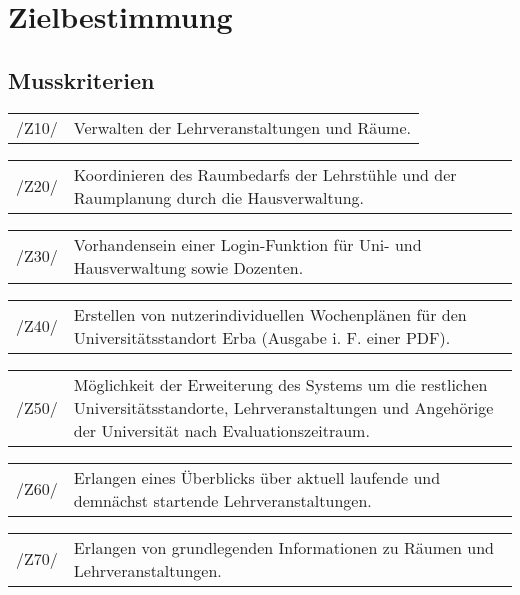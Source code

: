 \section{Zielbestimmung}
\label{sec:Zielbestimmung}

\subsection{Musskriterien}

\begin{tabular}{p{1.5cm}p{14.5cm}}	
	 /Z10/& Verwalten der Lehrveranstaltungen und Räume. \\[0.25cm]
\end{tabular}

\begin{tabular}{p{1.5cm}p{14.5cm}}	
	 /Z20/& Koordinieren des Raumbedarfs der Lehrstühle und der Raumplanung durch die  
  Hausverwaltung. \\[0.25cm]
\end{tabular}

\begin{tabular}{p{1.5cm}p{14.5cm}}	
	 /Z30/& Vorhandensein einer Login-Funktion für Uni- und Hausverwaltung sowie Dozenten. \\[0.25cm]
\end{tabular}

\begin{tabular}{p{1.5cm}p{14.5cm}}	
	 /Z40/& Erstellen von nutzerindividuellen Wochenplänen für den Universitätsstandort Erba
  (Ausgabe i. F. einer PDF). \\[0.25cm]
\end{tabular}

\begin{tabular}{p{1.5cm}p{14.5cm}}	
	 /Z50/& Möglichkeit der Erweiterung des Systems um die restlichen Universitätsstandorte, 
  Lehrveranstaltungen und Angehörige der Universität nach Evaluationszeitraum. \\[0.25cm]
\end{tabular}

\begin{tabular}{p{1.5cm}p{14.5cm}}	
	 /Z60/& Erlangen eines Überblicks über aktuell laufende und demnächst startende 
  Lehrveranstaltungen. \\[0.25cm]
\end{tabular}

\begin{tabular}{p{1.5cm}p{14.5cm}}	
	 /Z70/& Erlangen von grundlegenden Informationen zu Räumen und Lehrveranstaltungen. \\[0.25cm]
\end{tabular}

